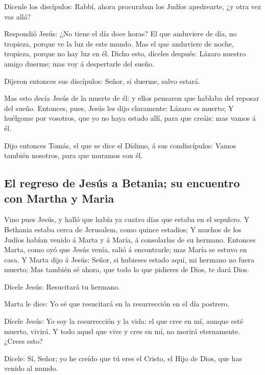  Dícenle los discípulos: Rabbí, ahora procuraban los Judíos
apedrearte, ¿y otra vez vas allá?

 Respondió Jesús: ¿No tiene el día doce horas? El que
anduviere de día, no tropieza, porque ve la luz de este mundo.
 Mas el que anduviere de noche, tropieza, porque no hay luz
en él.  Dicho esto, díceles después: Lázaro nuestro amigo
duerme; mas voy á despertarle del sueño.

 Dijeron entonces sus discípulos: Señor, si duerme, salvo
estará.

 Mas esto decía Jesús de la muerte de él: y ellos pensaron
que hablaba del reposar del sueño.  Entonces, pues, Jesús
les dijo claramente: Lázaro es muerto;  Y huélgome por
vosotros, que yo no haya estado allí, para que creáis: mas vamos á él.

 Dijo entonces Tomás, el que se dice el Dídimo, á sus
condiscípulos: Vamos también nosotros, para que muramos con él.

\hypertarget{el-regreso-de-jesuxfas-a-betania-su-encuentro-con-martha-y-maria}{%
\subsection{El regreso de Jesús a Betania; su encuentro con Martha y
Maria}\label{el-regreso-de-jesuxfas-a-betania-su-encuentro-con-martha-y-maria}}

 Vino pues Jesús, y halló que había ya cuatro días que
estaba en el sepulcro.  Y Bethania estaba cerca de
Jerusalem, como quince estadios;  Y muchos de los Judíos
habían venido á Marta y á María, á consolarlas de su hermano.
 Entonces Marta, como oyó que Jesús venía, salió á
encontrarle; mas María se estuvo en casa.  Y Marta dijo á
Jesús: Señor, si hubieses estado aquí, mi hermano no fuera muerto;
 Mas también sé ahora, que todo lo que pidieres de Dios, te
dará Dios.

 Dícele Jesús: Resucitará tu hermano.

 Marta le dice: Yo sé que resucitará en la resurrección en
el día postrero.

 Dícele Jesús: Yo soy la resurrección y la vida: el que
cree en mí, aunque esté muerto, vivirá.  Y todo aquel que
vive y cree en mí, no morirá eternamente. ¿Crees esto?

 Dícele: Sí, Señor; yo he creído que tú eres el Cristo, el
Hijo de Dios, que has venido al mundo.

